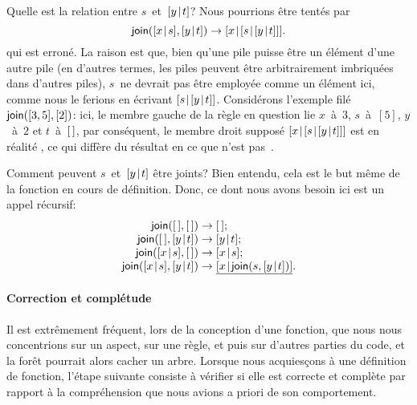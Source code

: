 Quelle est la relation entre \(s\)~et~\([{y}\!\mid\!{t}]\)? Nous pourrions
être tentés par
\begin{equation*}
\fun{join}(\cons{x}{s},\cons{y}{t}) \rightarrow 
  \cons{x}{\cons{s}{\cons{y}{t}}}.
\end{equation*}
qui est erroné. La raison est que, bien qu'une pile puisse être un
élément d'une autre pile (en d'autres termes, les piles peuvent être
arbitrairement imbriquées dans d'autres piles), \(s\)~ne devrait pas
être employée comme un élément ici, comme nous le ferions en écrivant
\([{s}\!\mid\!{[{y}\!\mid\!{t}]}]\). Considérons l'exemple filé
\(\textsf{join}([3,5],[2])\): ici, le membre gauche de la règle en
question lie \(x\)~à~\(3\), \(s\)~à~\([5]\), \(y\)~à~\(2\) et
\(t\)~à~\([\,]\), par conséquent, le membre droit supposé
\([{x}\!\mid\!{[{s}\!\mid\!{[{y}\!\mid\!{t}]}]}]\) est en réalité
, ce qui diffère du résultat
 en ce que \erlcode{[5]} n'est
pas~.

Comment peuvent \(s\)~et~\([{y}\!\mid\!{t}]\) être joints? Bien entendu,
cela est le but même de la fonction  en cours de
définition. Donc, ce dont nous avons besoin ici est un appel récursif:
\begin{equation*}
\begin{array}{r@{\;}l@{\;}l}
\fun{join}(\el,\el) & \rightarrow & \el;\\
\fun{join}(\el,\cons{y}{t}) & \rightarrow & \cons{y}{t};\\
\fun{join}(\cons{x}{s},\el) & \rightarrow & \cons{x}{s};\\
\fun{join}(\cons{x}{s},\cons{y}{t}) & \rightarrow & \underline{\cons{x}{\fun{join}(s,\cons{y}{t})}}.
\end{array}
\end{equation*}

\paragraph{Correction et complétude}

Il est extrêmement fréquent, lors de la conception d'une fonction, que
nous nous concentrions sur un aspect, sur une règle, et puis sur
d'autres parties du code, et la forêt pourrait alors cacher un
arbre. Lorsque nous acquiesçons à une définition de fonction, l'étape
suivante consiste à vérifier si elle est correcte et complète par
rapport à la compréhension que nous avions a priori de son
comportement.

